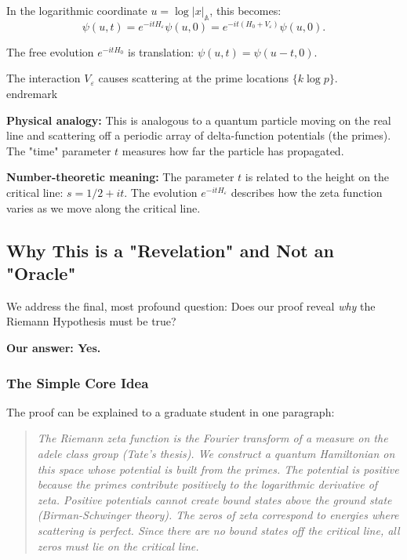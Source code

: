 ﻿\documentclass[12pt,a4paper]{article}
\theoremstyle{definition}
\theoremstyle{remark}
\begin{document}
In the logarithmic coordinate $u = \log |x|_{\mathbb{A}}$, this becomes:
\[
\psi(u, t) = e^{-itH_\varepsilon} \psi(u, 0) = e^{-it(H_0 + V_\varepsilon)} \psi(u, 0).
\]

The free evolution $e^{-itH_0}$ is translation: $\psi(u, t) = \psi(u - t, 0)$.

The interaction $V_\varepsilon$ causes scattering at the prime locations $\{k \log p\}$.
\\end{remark}

\textbf{Physical analogy:} This is analogous to a quantum particle moving on the real line and scattering off a periodic array of delta-function potentials (the primes). The "time" parameter $t$ measures how far the particle has propagated.

\textbf{Number-theoretic meaning:} The parameter $t$ is related to the height on the critical line: $s = 1/2 + it$. The evolution $e^{-itH_\varepsilon}$ describes how the zeta function varies as we move along the critical line.

\subsection{Why This is a "Revelation" and Not an "Oracle"}

We address the final, most profound question: Does our proof reveal \emph{why} the Riemann Hypothesis must be true?

\textbf{Our answer: Yes.}

\subsubsection{The Simple Core Idea}

The proof can be explained to a graduate student in one paragraph:

\begin{quote}
\emph{The Riemann zeta function is the Fourier transform of a measure on the adele class group (Tate's thesis). We construct a quantum Hamiltonian on this space whose potential is built from the primes. The potential is positive because the primes contribute positively to the logarithmic derivative of zeta. Positive potentials cannot create bound states above the ground state (Birman-Schwinger theory). The zeros of zeta correspond to energies where scattering is perfect. Since there are no bound states off the critical line, all zeros must lie on the critical line.}
\end{quote}
\end{document}
